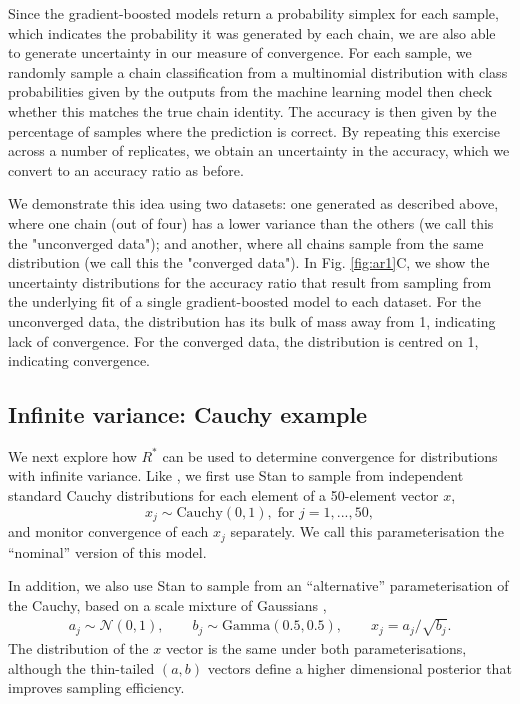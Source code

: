 \documentclass{article}
\newcommand{\N}{\mathcal{N}}
\begin{document}
Since the gradient-boosted models return a probability simplex for each sample, which indicates the probability it was generated by each chain, we are also able to generate uncertainty in our measure of convergence. For each sample, we randomly sample a chain classification from a multinomial distribution with class probabilities given by the outputs from the machine learning model then check whether this matches the true chain identity. The accuracy is then given by the percentage of samples where the prediction is correct. By repeating this exercise across a number of replicates, we obtain an uncertainty in the accuracy, which we convert to an accuracy ratio as before.

We demonstrate this idea using two datasets: one generated as described above, where one chain (out of four) has a lower variance than the others (we call this the "unconverged data"); and another, where all chains sample from the same distribution (we call this the "converged data"). In Fig. \ref{fig:ar1}C, we show the uncertainty distributions for the accuracy ratio that result from sampling from the underlying fit of a single gradient-boosted model to each dataset. For the unconverged data, the distribution has its bulk of mass away from 1, indicating lack of convergence. For the converged data, the distribution is centred on 1, indicating convergence. 

\subsection{Infinite variance: Cauchy example}
We next explore how $R^*$ can be used to determine convergence for distributions with infinite variance. Like \cite{vehtari2019rank}, we first use Stan to sample from independent standard Cauchy distributions for each element of a 50-element vector $x$,
%
\begin{equation}
x_j\sim \text{Cauchy}(0, 1),\; \text{for } j=1,...,50,
\end{equation}
%
and monitor convergence of each $x_j$ separately. We call this parameterisation the ``nominal'' version of this model.

In addition, we also use Stan to sample from an ``alternative'' parameterisation of the Cauchy, based on a scale mixture of Gaussians \cite{vehtari2019rank},
%
\begin{align}
a_j \sim  \N(0,1), \qquad
b_j \sim  \text{Gamma}(0.5, 0.5), \qquad
x_j =  a_j/\sqrt{b_j}.
\end{align}
%
The distribution of the $x$ vector is the same under both parameterisations, although the thin-tailed $(a,b)$ vectors define a higher dimensional posterior that improves sampling efficiency.
\end{document}
